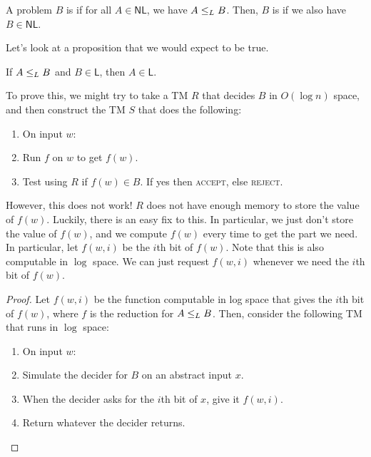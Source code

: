 \documentclass{standalone}
\begin{document}
\begin{definition}
  A problem \(B\) is  if
  for all \(A \in \mathsf{NL}\), we have \(A \mathrel{\leq_L} B\).
  Then, \(B\) is 
  if we also have \(B \in \mathsf{NL}\).
\end{definition}

Let's look at a proposition that we would expect to be true.
\begin{proposition}
  If \(A \mathrel{\leq_L} B\) and \(B \in \mathsf{L}\), then \(A \in \mathsf{L}\).
\end{proposition}
To prove this, we might try to take a \textsf{TM} \(R\)
that decides \(B\) in \(O(\log n)\) space,
and then construct the \textsf{TM} \(S\) that does the following:
\begin{enumerate}[start=0]
  \item On input \(w\):
  \item Run \(f\) on \(w\) to get \(f(w)\).
  \item Test using \(R\) if \(f(w) \in B\).
        If yes then \textsc{accept},
        else \textsc{reject}.
\end{enumerate}
However, this does not work!
\(R\) does not have enough memory to store the value of \(f(w)\).
Luckily, there is an easy fix to this.
In particular, we just don't store the value of \(f(w)\),
and we compute \(f(w)\) every time to get the part we need.
In particular, let \(f(w, i)\) be the \(i\)th bit of \(f(w)\).
Note that this is also computable in \(\log\) space.
We can just request \(f(w, i)\) whenever we need the \(i\)th bit of \(f(w)\).
\begin{proof}
  Let \(f(w, i)\) be the function computable in log space
  that gives the \(i\)th bit of \(f(w)\),
  where \(f\) is the reduction for \(A \mathrel{\leq_L} B\).
  Then, consider the following \textsf{TM} that runs in \(\log\) space:
  \begin{enumerate}[start=0]
    \item On input \(w\):
    \item Simulate the decider for \(B\) on an abstract input \(x\).
    \item When the decider asks for the \(i\)th bit of \(x\),
          give it \(f(w, i)\).
    \item Return whatever the decider returns.\qedhere
  \end{enumerate}
\end{proof}
\end{document}
